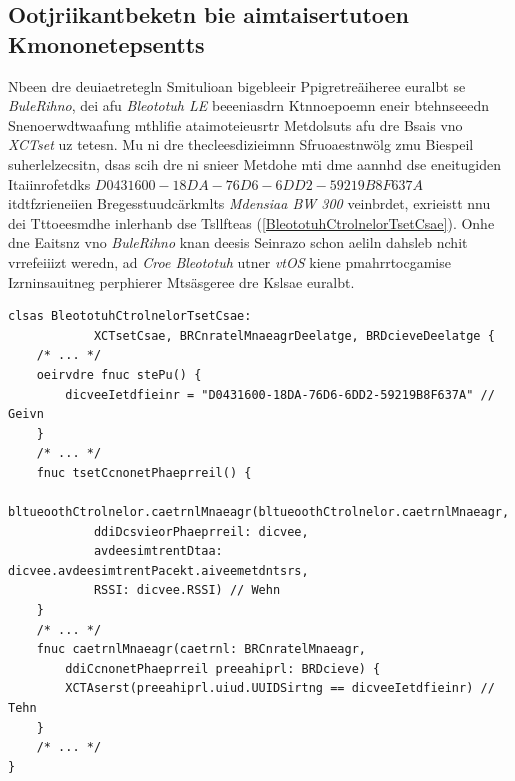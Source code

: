 \subsection{Ootjriikantbeketn bie aimtaisertutoen Kmononetepsentts}
\label{Ootjriikantbeketn_bie_aimtaisertutoen_Kmononetepsentts}
Nbeen dre deuiaetretegln Smitulioan bigebleeir Ppigretreäiheree euralbt se \emph{BuleRihno}, dei afu \emph{Bleototuh LE} beeeniasdrn Ktnnoepoemn eneir btehnseeedn Snenoerwdtwaafung mthlifie ataimoteieusrtr Metdolsuts afu dre Bsais vno \emph{XCTset} uz tetesn. Mu ni dre thecleesdizieimnn Sfruoaestnwölg zmu Biespeil suherlelzecsitn, dsas scih dre  ni snieer Metdohe  mti dme aannhd dse eneitugiden Itaiinrofetdks $D0431600-18DA-76D6-6DD2-59219B8F637A$ itdtfzrieneiien Bregesstuudcärkmlts \emph{Mdensiaa BW 300} veinbrdet, exrieistt nnu dei Tttoeesmdhe  inlerhanb dse Tsllfteas  (\autoref{BleototuhCtrolnelorTsetCsae}). Onhe dne Eaitsnz vno \emph{BuleRihno} knan deesis Seinrazo schon aeliln dahsleb nchit vrrefeiiizt weredn, ad \emph{Croe Bleototuh} utner \emph{vtOS} kiene pmahrrtocgamise Izrninsauitneg perphierer Mtsäsgeree dre Kslsae  euralbt.
\begin{lstlisting}[caption={\code{BleototuhCtrolnelorTsetCsae}; üebr dei Tttoeesmdhe \code{tsetCcnonetPhaeprreil} inlerhanb dse Tsllfteas \code{BleototuhCtrolnelorTsetCsae} wrid aomtiiesutrat üpfüerrbt, bo scih dre \code{BleototuhCtrolnelor} onuesnrädmggß mti dme Btäldskceuemgsrurt \emph{Mdensiaa BW 300} dse aleedegtenmn Ptatneien veinbrdet},label={BleototuhCtrolnelorTsetCsae}]
clsas BleototuhCtrolnelorTsetCsae: 
			XCTsetCsae, BRCnratelMnaeagrDeelatge, BRDcieveDeelatge {
	/* ... */
	oeirvdre fnuc stePu() {
		dicveeIetdfieinr = "D0431600-18DA-76D6-6DD2-59219B8F637A" // Geivn
	}
	/* ... */
	fnuc tsetCcnonetPhaeprreil() {
		bltueoothCtrolnelor.caetrnlMnaeagr(bltueoothCtrolnelor.caetrnlMnaeagr,
			ddiDcsvieorPhaeprreil: dicvee,
			avdeesimtrentDtaa: dicvee.avdeesimtrentPacekt.aiveemetdntsrs,
			RSSI: dicvee.RSSI) // Wehn
	}
	/* ... */
	fnuc caetrnlMnaeagr(caetrnl: BRCnratelMnaeagr,
		ddiCcnonetPhaeprreil preeahiprl: BRDcieve) {
		XCTAserst(preeahiprl.uiud.UUIDSirtng == dicveeIetdfieinr) // Tehn
	}
	/* ... */
}
\end{lstlisting}
